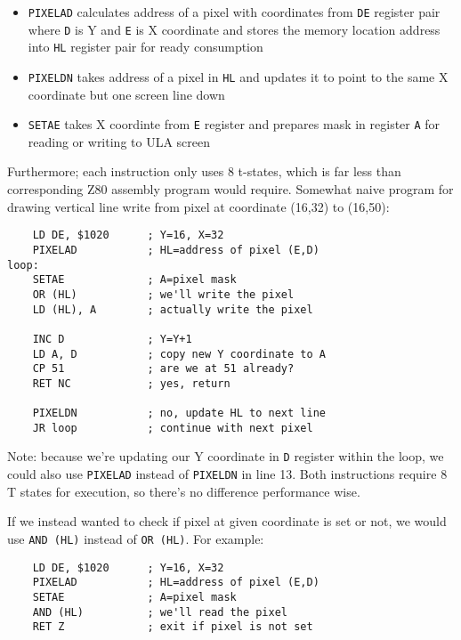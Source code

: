 \begin{itemize}[topsep=1pt,itemsep=1pt]
    \item {\tt PIXELAD} calculates address of a pixel with coordinates from {\tt DE} register pair where {\tt D} is Y and {\tt E} is X coordinate and stores the memory location address into {\tt HL} register pair for ready consumption
	
    \item {\tt PIXELDN} takes address of a pixel in {\tt HL} and updates it to point to the same X coordinate but one screen line down
	
    \item {\tt SETAE} takes X coordinte from {\tt E} register and prepares mask in register {\tt A} for reading or writing to ULA screen
\end{itemize}

Furthermore; each instruction only uses 8 t-states, which is far less than corresponding Z80 assembly program would require. Somewhat naive program for drawing vertical line write from pixel at coordinate (16,32) to (16,50):

\begin{lstlisting}
    LD DE, $1020      ; Y=16, X=32
    PIXELAD           ; HL=address of pixel (E,D)
loop:
    SETAE             ; A=pixel mask
    OR (HL)           ; we'll write the pixel
    LD (HL), A        ; actually write the pixel
	
    INC D             ; Y=Y+1
    LD A, D           ; copy new Y coordinate to A
    CP 51             ; are we at 51 already?
    RET NC            ; yes, return

    PIXELDN           ; no, update HL to next line
    JR loop           ; continue with next pixel
\end{lstlisting}

Note: because we're updating our Y coordinate in {\tt D} register within the loop, we could also use {\tt PIXELAD} instead of {\tt PIXELDN} in line 13. Both instructions require 8 T states for execution, so there's no difference performance wise.

If we instead wanted to check if pixel at given coordinate is set or not, we would use {\tt AND (HL)} instead of {\tt OR (HL)}. For example:

\begin{lstlisting}
    LD DE, $1020      ; Y=16, X=32
    PIXELAD           ; HL=address of pixel (E,D)
    SETAE             ; A=pixel mask
    AND (HL)          ; we'll read the pixel
    RET Z             ; exit if pixel is not set
\end{lstlisting}


